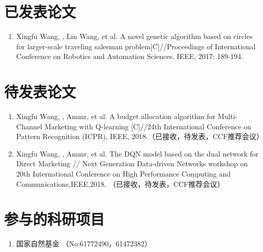 ﻿\begin{publications}

\section*{已发表论文}

\begin{enumerate}
\item  Xingfu Wang, , Lin Wang, et al. A novel genetic algorithm based on circles for larger-scale traveling salesman problem[C]//Proceedings of International Conference on Robotics and Automation Sciences. IEEE, 2017: 189-194.
\end{enumerate}

\section*{待发表论文}

\begin{enumerate}
\item Xingfu Wang, , Ammr, et al. A budget allocation algorithm for Multi-Channel Marketing with Q-learning [C]//24th International Conference on Pattern Recognition (ICPR), IEEE, 2018.（已接收，待发表，CCF推荐会议）

\item Xingfu Wang, , Ammr, et al. The DQN model based on the dual network for Direct Marketing // Next Generation Data-driven Networks workshop on 20th International Conference on High Performance Computing and Communications,IEEE,2018. （已接收，待发表，CCF推荐会议）



\end{enumerate}

\section*{参与的科研项目}
\begin{enumerate}
\item 国家自然基金 （No:61772490，61472382）

\end{enumerate}

\end{publications}
